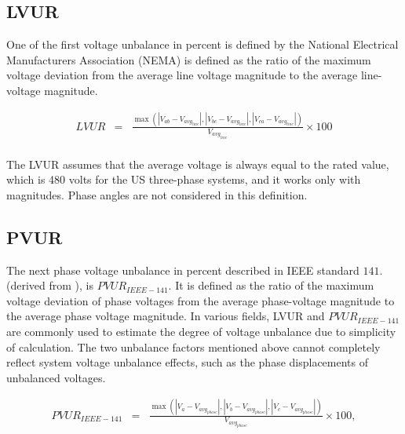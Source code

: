 	
	\subsection{LVUR}\label{BASICUNB:sec:LVUR}
	
	One of the first voltage unbalance in percent is defined by the National Electrical Manufacturers Association (NEMA) \cite{bonnett1997understanding} is defined  as the ratio of the maximum voltage deviation from the average line voltage magnitude to the average line-voltage magnitude.
	
\begin{equation}
        \begin{array}{rcl}
            LVUR&=&\frac{\max\left( |V_{ab}-V_{avg_{line}}|,|V_{bc}-V_{avg_{line}}|,|V_{ca}-V_{avg_{line}}| \right)}{V_{avg_{line}}}\times100\\			
        \end{array}
        \label{BASICUNB:equ:LVUR}
    \end{equation}
		
		The LVUR assumes that the average voltage is always equal to the rated value, which is 480 volts for the US three-phase systems, and it works only with magnitudes. Phase angles are not considered in this definition.
	
	\subsection{PVUR}\label{BASICUNB:sec:PVUR}
	
	The next phase voltage unbalance in percent described in IEEE standard $141.$ \cite{IEEE_141_35071} (derived from \cite{IEEE_112_8635630}), is $PVUR_{IEEE-141}$. It is defined as the ratio of the maximum voltage deviation of phase voltages from the average phase-voltage magnitude to the average phase voltage magnitude. In various fields, LVUR and $PVUR_{IEEE-141}$ are commonly used to estimate the degree of voltage unbalance due to simplicity of calculation. The two unbalance factors mentioned above cannot completely reflect system voltage unbalance effects, such as the phase displacements of unbalanced voltages.
	
	\begin{equation}
        \begin{array}{rcl}
            PVUR_{IEEE-141}&=&\frac{\max\left( |V_{a}-V_{avg_{phase}}|,|V_{b}-V_{avg_{phase}}|,|V_{c}-V_{avg_{phase}}| \right)}{V_{avg_{phase}}}\times100,\\
        \end{array}
        \label{BASICUNB:equ:PVUR-141}
    \end{equation}

